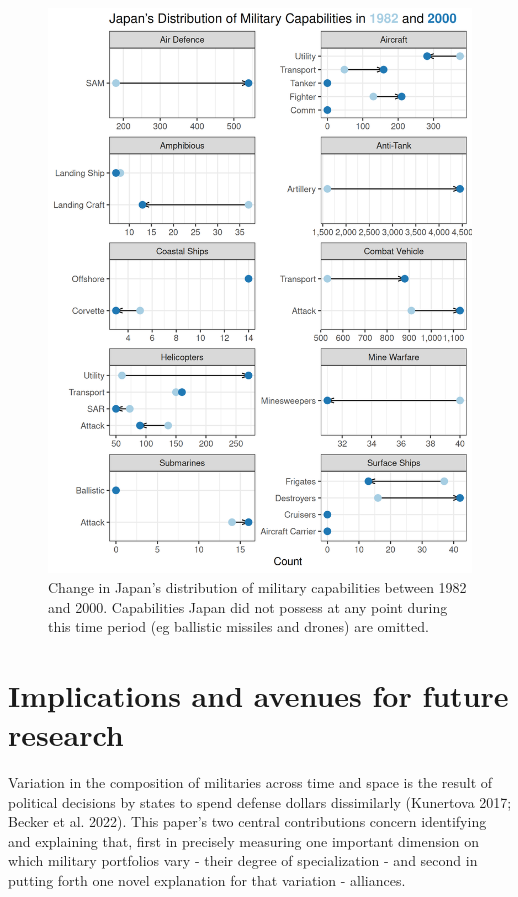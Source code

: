 \documentclass[
  12,
  letterpaper,
  DIV=11,
  numbers=noendperiod]{scrartcl}
\begin{document}
\begin{figure}[H]

{\centering \includegraphics{2023-07-13_Specialization_files/figure-pdf/fig-japan-1.png}

}

\caption{\label{fig-japan}Change in Japan's distribution of military
capabilities between 1982 and 2000. Capabilities Japan did not possess
at any point during this time period (eg ballistic missiles and drones)
are omitted.}

\end{figure}

\hypertarget{sec-conclusion}{%
\section{Implications and avenues for future
research}\label{sec-conclusion}}

Variation in the composition of militaries across time and space is the
result of political decisions by states to spend defense dollars
dissimilarly (Kunertova 2017; Becker et al. 2022). This paper's two
central contributions concern identifying and explaining that, first in
precisely measuring one important dimension on which military portfolios
vary - their degree of specialization - and second in putting forth one
novel explanation for that variation - alliances.
\end{document}
